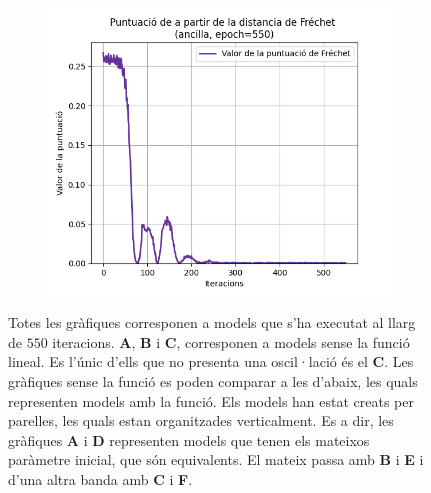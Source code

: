 \begin{figure}
\begin{subfigure}[b]{.32\linewidth}
		\includegraphics[width=\linewidth]{figures/data/FD_score_A3.png}
		\caption{}
	\end{subfigure}
\label{fig:550_SD_score}
\caption{Totes les gràfiques corresponen a models que s'ha executat al llarg de $550$ iteracions. \textbf{A}, \textbf{B} i \textbf{C}, corresponen a models sense la funció lineal. Es l'únic d'ells que no presenta una oscil·lació és el \textbf{C}. Les gràfiques sense la funció es poden comparar a les d'abaix, les quals representen models amb la funció. Els models han estat creats per parelles, les quals estan organitzades verticalment. Es a dir, les gràfiques \textbf{A} i \textbf{D} representen models que tenen els mateixos paràmetre inicial, que són equivalents. El mateix passa amb \textbf{B} i \textbf{E} i d'una altra banda amb \textbf{C} i \textbf{F}.}
	
\end{figure}


